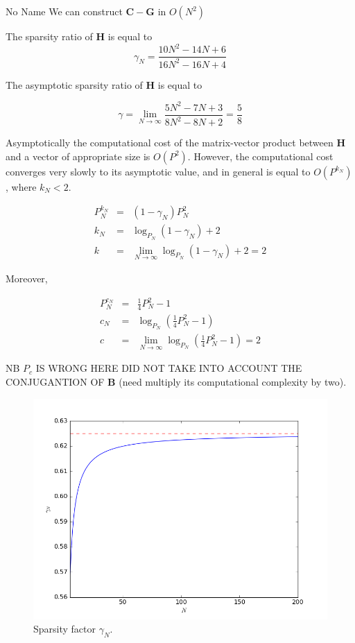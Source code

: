 \documentclass[a4paper,10pt]{article}
\begin{document}
\begin{section}{No Name}
We can construct $\boldsymbol{C}-\boldsymbol{G}$ in $O(N^2)$ 


The sparsity ratio of $\boldsymbol{H}$ is equal to
\begin{equation}
\gamma_N = \frac{10N^2-14N+6}{16N^2-16N+4} 
\end{equation}

The asymptotic sparsity ratio of $\boldsymbol{H}$ is equal to

\begin{equation}
\gamma = \lim_{N\rightarrow \infty}\frac{5N^2-7N+3}{8N^2-8N+2} = \frac{5}{8}
\end{equation}

Asymptotically the computational cost of the matrix-vector product between $\boldsymbol{H}$ and a vector of appropriate size is $O(P^2)$. However, the computational cost converges 
very slowly to its asymptotic value, and in general is equal to $O(P^{k_N})$, where $k_N < 2$.

\begin{eqnarray}
P^{k_N}_N &=& (1 - \gamma_N)P^2_N\\
k_N &=& \log_{P_N}(1 - \gamma_N) + 2\\
k &=& \lim_{N\rightarrow \infty} \log_{P_N}(1 - \gamma_N) + 2 = 2
\end{eqnarray}

Moreover,

\begin{eqnarray}
P^{c_N}_N &=& \frac{1}{4} P_N^2 -1\\
c_N &=& \log_{P_N}\left (\frac{1}{4} P_N^2-1 \right )\\
c &=& \lim_{N\rightarrow \infty} \log_{P_N}\left (\frac{1}{4} P_N^2-1\right ) = 2
\end{eqnarray}

NB $P_c$ IS WRONG HERE DID NOT TAKE INTO ACCOUNT THE CONJUGANTION OF $\boldsymbol{B}$ (need multiply its computational complexity by two).

\begin{figure}
  \includegraphics[width=\linewidth]{sparsity_factor.png}
  \caption{Sparsity factor $\gamma_N$.}
\end{figure}


\end{section}
\end{document}
